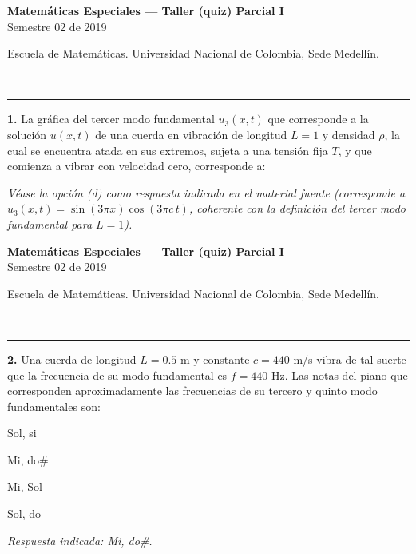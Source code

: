 \documentclass[11pt]{article}
\newcommand{\examheader}{%
  \noindent
  \begin{minipage}[t]{0.6\linewidth}
    {\small\bfseries Matem\'aticas Especiales --- Taller (quiz) Parcial I}\\
    {\small Semestre 02 de 2019}
  \end{minipage}%
  \hfill
  \begin{minipage}[t]{0.35\linewidth}
    \raggedleft\small Escuela de Matem\'aticas. Universidad Nacional de Colombia, Sede Medell\'in.
  \end{minipage}\\[2pt]
  \rule{\linewidth}{0.6pt}
}
\begin{document}
\examheader
\vspace{6pt}

\textbf{1.} La gr\'afica del tercer modo fundamental $u_3(x,t)$ que corresponde a la soluci\'on $u(x,t)$ de una cuerda en vibraci\'on de longitud $L=1$ y densidad $\rho$, la cual se encuentra atada en sus extremos, sujeta a una tensi\'on fija $T$, y que comienza a vibrar con velocidad cero, corresponde a:

\begin{center}
\end{center}

\vspace{4pt}
\textit{V\'ease la opci\'on (d) como respuesta indicada en el material fuente (corresponde a \\
$u_3(x,t)=\sin(3\pi x)\cos(3\pi c\,t)$, coherente con la definici\'on del tercer modo fundamental para $L=1$).}

\clearpage
\examheader
\vspace{6pt}

\textbf{2.} Una cuerda de longitud $L=0.5$ m y constante $c=440$ m/s vibra de tal suerte que la frecuencia de su modo fundamental es $f=440$ Hz. Las notas del piano que corresponden aproximadamente las frecuencias de su tercero y quinto modo fundamentales son:
\begin{opciones}
  \item Sol, si
  \item Mi, do\#
  \item Mi, Sol
  \item Sol, do
\end{opciones}
\textit{Respuesta indicada: Mi, do\#.}
\end{document}

